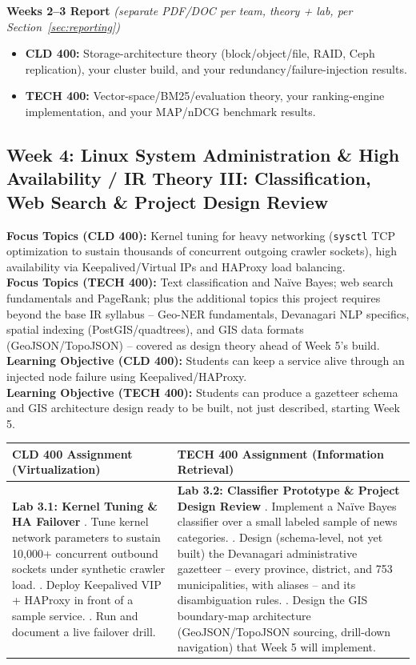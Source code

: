 \documentclass[10pt, a4paper]{article}
\newcommand{\weeklyreport}[3]{%
  \par\vspace{0.4em}
  \noindent\colorbox{lightgray!35}{\parbox{\dimexpr\textwidth-2\fboxsep\relax}{%
    \textbf{\color{primary}#1 Report} \textit{(separate PDF/DOC per team, theory + lab, per Section~\ref{sec:reporting})}
    \begin{itemize}
        \item \textbf{CLD 400:} #2
        \item \textbf{TECH 400:} #3
    \end{itemize}
  }}%
  \par\vspace{0.3em}
}
\begin{document}
\weeklyreport{Weeks 2--3}{Storage-architecture theory (block/object/file, RAID, Ceph replication), your cluster build, and your redundancy/failure-injection results.}{Vector-space/BM25/evaluation theory, your ranking-engine implementation, and your MAP/nDCG benchmark results.}

\newpage

\subsection*{Week 4: Linux System Administration \& High Availability / IR Theory III: Classification, Web Search \& Project Design Review}
\textbf{Focus Topics (CLD 400):} Kernel tuning for heavy networking (\texttt{sysctl} TCP optimization to sustain thousands of concurrent outgoing crawler sockets), high availability via Keepalived/Virtual IPs and HAProxy load balancing. \\[0.35em]
\textbf{Focus Topics (TECH 400):} Text classification and Na\"ive Bayes; web search fundamentals and PageRank; plus the additional topics this project requires beyond the base IR syllabus -- Geo-NER fundamentals, Devanagari NLP specifics, spatial indexing (PostGIS/quadtrees), and GIS data formats (GeoJSON/TopoJSON) -- covered as design theory ahead of Week 5's build. \\[0.35em]
\textbf{Learning Objective (CLD 400):} Students can keep a service alive through an injected node failure using Keepalived/HAProxy. \\[0.35em]
\textbf{Learning Objective (TECH 400):} Students can produce a gazetteer schema and GIS architecture design ready to be built, not just described, starting Week 5.

\begin{table}[H]
\centering
\small
\renewcommand{\arraystretch}{1.2}
\begin{tabularx}{\textwidth}{|X|X|}
\hline
\rowcolor{lightgray}
\textbf{CLD 400 Assignment (Virtualization)} & \textbf{TECH 400 Assignment (Information Retrieval)} \\ \hline
\textbf{Lab 3.1: Kernel Tuning \& HA Failover} \newline
1. Tune kernel network parameters to sustain 10,000+ concurrent outbound sockets under synthetic crawler load. \newline
2. Deploy Keepalived VIP + HAProxy in front of a sample service. \newline
3. Run and document a live failover drill. & \textbf{Lab 3.2: Classifier Prototype \& Project Design Review} \newline
1. Implement a Na\"ive Bayes classifier over a small labeled sample of news categories. \newline
2. Design (schema-level, not yet built) the Devanagari administrative gazetteer -- every province, district, and 753 municipalities, with aliases -- and its disambiguation rules. \newline
3. Design the GIS boundary-map architecture (GeoJSON/TopoJSON sourcing, drill-down navigation) that Week 5 will implement. \\ \hline
\end{tabularx}
\end{table}
\end{document}
